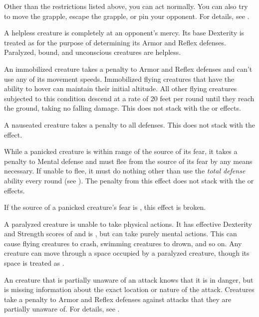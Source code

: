 Other than the restrictions listed above, you can act normally. You can also try to move the grapple, escape the grapple, or pin your opponent. For details, see .

 A helpless creature is completely at an opponent's mercy.
Its base Dexterity is treated as  for the purpose of determining its Armor and Reflex defenses.
Paralyzed, bound, and unconscious creatures are helpless.

 An immobilized creature takes a  penalty to Armor and Reflex defenses and can't use any of its movement speeds.
Immobilized flying creatures that have the ability to hover can maintain their initial altitude.
All other flying creatures subjected to this condition descend at a rate of 20 feet per round until they reach the ground, taking no falling damage.
This does not stack with the \slowed or \decelerated effects.

 A nauseated creature takes a  penalty to all defenses.
This does not stack with the \sickened effect.

 While a panicked creature is within \rngmed range of the source of its fear, it takes a  penalty to Mental defense and must flee from the source of its fear by any means necessary.
If unable to flee, it must do nothing other than use the \textit{total defense} ability every round (see ).
The penalty from this effect does not stack with the \frightened or \panicked effects.

If the source of a panicked creature's fear is , this effect is broken.

 A paralyzed creature is unable to take physical actions. It has effective Dexterity and Strength scores of  and is \helpless, but can take purely mental actions. This can cause flying creatures to crash, swimming creatures to drown, and so on. Any creature can move through a space occupied by a paralyzed creature, though its space is treated as .

 An creature that is partially unaware of an attack knows that it is in danger, but is missing information about the exact location or nature of the attack.
Creatures take a  penalty to Armor and Reflex defenses against attacks that they are partially unaware of.
For details, see .

